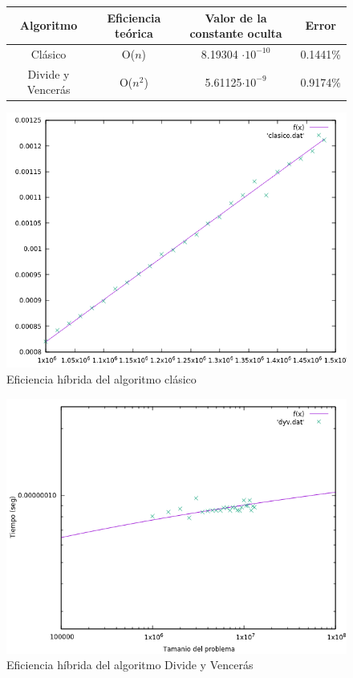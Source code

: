 \documentclass[12pt,spanish]{article}
\begin{document}
\begin{figure}[H]
\centering
\begin{tabular}{|c|c|c|c|}
\hline
\textbf{Algoritmo} & \textbf{Eficiencia teórica} & \textbf{Valor de la constante oculta} & \textbf{Error} \\
\hline
Clásico & O($n$) & 8.19304 $\cdot 10^{-10} $ &0.1441\% \\
Divide y Vencerás & O($n^2$) & 5.61125$\cdot 10^{-9} $ & 0.9174\% \\
\hline
\end{tabular}
\end{figure}

\newpage 

\begin{figure}[H]
\centering
\includegraphics[scale=0.75]{hibrida_clasico.png}
\caption{Eficiencia híbrida del algoritmo clásico}
\end{figure}

\begin{figure}[H]
\centering
\includegraphics[scale=0.75]{hibrida_dyv.png}
\caption{Eficiencia híbrida del algoritmo Divide y Vencerás}
\end{figure}
\end{document}
